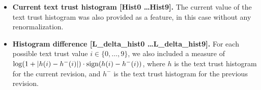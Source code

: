 \begin{itemize}
\item \textbf{Current text trust histogram [Hist0 \ldots Hist9].}
The current value of the text trust histogram was also provided as a
feature, in this case without any renormalization.

\item \textbf{Histogram difference [L\_delta\_hist0 \ldots L\_delta\_hist9].}
For each possible text trust value $i \in \{0, \ldots, 9\}$, we also
included a measure of $\log(1 + |h(i) - h^{-}(i)|) \cdot {{\textrm{sign}}}(h(i) -
h^{-}(i))$, where $h$ is the text trust histogram for the current
revision, and $h^{-}$ is the text trust histogram for the previous
revision.

\end{itemize}
%

